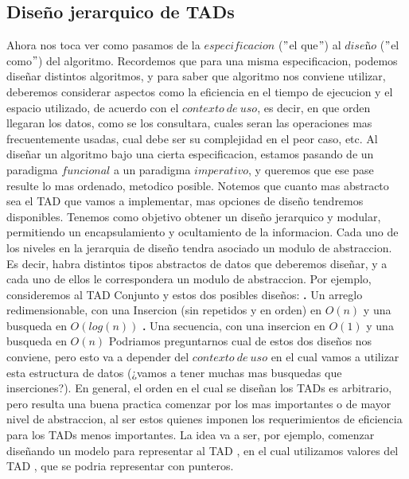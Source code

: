 \documentclass[10pt,a4paper]{article}
\begin{document}
\subsection{Diseño jerarquico de TADs}

Ahora nos toca ver como pasamos de la $especificacion$ ($"$el que$"$) al $dise$ñ$o$ ($"$el como$"$) del algoritmo. Recordemos que para una misma especificacion, podemos diseñar distintos algoritmos, y para saber que algoritmo nos conviene utilizar, deberemos considerar aspectos como la eficiencia en el tiempo de ejecucion y el espacio utilizado, de acuerdo con el $contexto~de~uso$, es decir, en que orden llegaran los datos, como se los consultara, cuales seran las operaciones mas frecuentemente usadas, cual debe ser su complejidad en el peor caso, etc.
\newline
\newline
Al diseñar un algoritmo bajo una cierta especificacion, estamos pasando de un paradigma $funcional$ a un paradigma $imperativo$, y queremos que ese pase resulte lo mas ordenado, metodico posible. Notemos que cuanto mas abstracto sea el TAD que vamos a implementar, mas opciones de diseño tendremos disponibles. Tenemos como objetivo obtener un diseño jerarquico y modular, permitiendo un encapsulamiento y ocultamiento de la informacion. Cada uno de los niveles en la jerarquia de diseño tendra asociado un modulo de abstraccion. Es decir, habra distintos tipos abstractos de datos que deberemos diseñar, y a cada uno de ellos le correspondera un modulo de abstraccion. Por ejemplo, consideremos al TAD Conjunto y estos dos posibles diseños:
\newline
\newline
\textbf{.} Un arreglo redimensionable, con una Insercion (sin repetidos y en orden) en $O(n)$ y una busqueda en $O(log(n))$
\newline
\newline
\textbf{.} Una secuencia, con una insercion en $O(1)$ y una busqueda en $O(n)$
\newline
\newline
Podriamos preguntarnos cual de estos dos diseños nos conviene, pero esto va a depender del $contexto~de~uso$ en el cual vamos a utilizar esta estructura de datos (¿vamos a tener muchas mas busquedas que inserciones?).
\newline
\newline
En general, el orden en el cual se diseñan los TADs es arbitrario, pero resulta una buena practica comenzar por los mas importantes o de mayor nivel de abstraccion, al ser estos quienes imponen los requerimientos de eficiencia para los TADs menos importantes. La idea va a ser, por ejemplo, comenzar diseñando un modelo para representar al TAD , en el cual utilizamos valores del TAD , que se podria representar con punteros.
\end{document}
